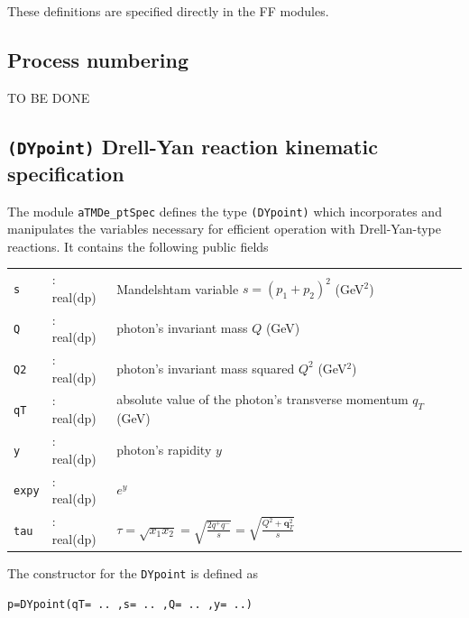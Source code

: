 \documentclass[prd,nofootinbib,eqsecnum,final]{revtex4}
\renewcommand{\(}{\left(}
\renewcommand{\)}{\right)}
\renewcommand{\[}{\left[}
\renewcommand{\]}{\right]}
\renewcommand{\vec}[1]{\bm{#1}}
\newcommand{\red}[1]{{\color[rgb]{1,0,0} #1}}
\begin{document}
\begin{tcolorbox}
\begin{center}
These definitions are specified directly in the FF modules.
\end{center}
\end{tcolorbox}

\subsection{Process numbering}
\red{TO BE DONE}

\subsection{\texttt{(DYpoint)} Drell-Yan reaction kinematic specification}
\label{sec:DYpoint}

The module \texttt{aTMDe\_ptSpec} defines the type \texttt{(DYpoint)} which incorporates and manipulates the variables necessary for efficient operation with Drell-Yan-type reactions. It contains the following public fields
\begin{tabular}{lll}
\texttt{s} &: real(dp)& Mandelshtam variable $s=(p_1+p_2)^2$ (GeV$^2$)
\\
\texttt{Q} &: real(dp)& photon's invariant mass $Q$ (GeV)
\\
\texttt{Q2} &: real(dp)& photon's invariant mass squared $Q^2$ (GeV$^2$)
\\
\texttt{qT} &: real(dp)& absolute value of the photon's transverse momentum $q_T$(GeV)
\\
\texttt{y} &: real(dp)& photon's rapidity $y$
\\
\texttt{expy} &: real(dp)& $e^y$
\\
\texttt{tau} &: real(dp)& $\tau=\sqrt{x_1x_2}=\sqrt{\frac{2q^+q^-}{s}}=\sqrt{\frac{Q^2+\vec q_T^2}{s}}$
\end{tabular}

The constructor for the \texttt{DYpoint} is defined as 
\begin{center}
\texttt{p=DYpoint(qT= .. ,s= .. ,Q= .. ,y= ..)}
\end{center}
\end{document}
